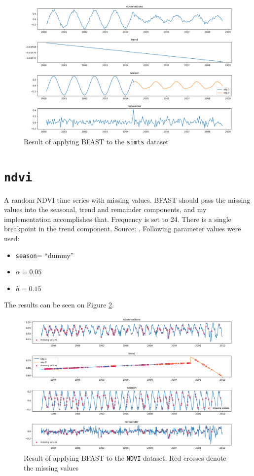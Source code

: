 \documentclass[main.tex]{subfiles}
\begin{document}
\begin{figure}
  \centering
  \includegraphics[width=\textwidth]{imgs/simts.png}
  \caption{Result of applying BFAST to the \texttt{simts} dataset}
  \label{plt:simts}
\end{figure}

\section{\texttt{ndvi}}
\label{sec:val_ndvi}
A random NDVI time series with missing values. BFAST should pass the missing
values into the seasonal, trend and remainder components, and my implementation
accomplishes that. Frequency is set to 24.
There is a single breakpoint in the trend component.
Source: \cite{bfast}. Following parameter values were used:
\begin{itemize}
\item \texttt{season}= ``dummy''
\item $\alpha = 0.05$
\item $h = 0.15$
\end{itemize}
The results can be seen on Figure \ref{plt:ndvi}.
\begin{figure}
  \centering
  \includegraphics[width=\textwidth]{imgs/ndvi.png}
  \caption{Result of applying BFAST to the \texttt{NDVI} dataset. Red crosses
    denote the missing values}
  \label{plt:ndvi}
\end{figure}


\biblio
\end{document}
